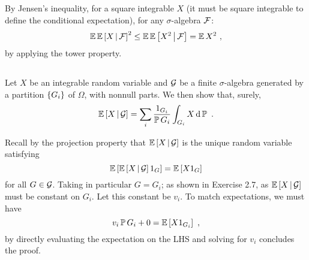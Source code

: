 \documentclass{article}
\begin{document}
        \subsection{}

        
        By Jensen's inequality, for a square integrable \(X\) (it must be square integrable to define the conditional expectation), for any \(\sigma\)-algebra \(\mathcal{F}\):
        \[
          \operatorname{\mathbb{E}}\operatorname{\mathbb{E}}\left[ X \,\middle|\, \mathcal{F} \right]^2\le \operatorname{\mathbb{E}}\operatorname{\mathbb{E}}\left[ X^2 \,\middle|\, \mathcal{F} \right]=\operatorname{\mathbb{E}} X^2\,\,,
        \]
        by applying the tower property.

        \subsection{}

        Let \(X\) be an integrable random variable and \(\mathcal{G}\) be a finite \(\sigma\)-algebra generated by a partition \(\left\{{G_i}\right\}\) of \(\Omega\), with nonnull parts. We then show that, surely,
        \[
          \operatorname{\mathbb{E}}\left[ X \,\middle|\, \mathcal{G} \right]=\sum_i\frac{1_{G_i}}{\operatorname{\mathbb{P}} G_i}\int_{G_i}X\mathop{\mathrm{d} \operatorname{\mathbb{P}} }\,\,.
        \]

        Recall by the projection property that \(\operatorname{\mathbb{E}}\left[ X \,\middle|\, \mathcal{G} \right]\) is the unique random variable satisfying
        \[
          \operatorname{\mathbb{E}}\left[{\operatorname{\mathbb{E}}\left[ X \,\middle|\, \mathcal{G} \right]1_G}\right]=\operatorname{\mathbb{E}}\left[{X1_G}\right]
        \]
        for all \(G\in \mathcal{G}\). Taking in particular \(G=G_i\); as shown in Exercise 2.7, as \(\operatorname{\mathbb{E}}\left[ X \,\middle|\, \mathcal{G} \right]\) must be constant on \(G_i\). Let this constant be \(v_i\). To match expectations, we must have
        \[
          v_i\operatorname{\mathbb{P}} G_i+0=\operatorname{\mathbb{E}}\left[{X1_{G_i}}\right]\,\,,
        \]
        by directly evaluating the expectation on the LHS and solving for \(v_i\) concludes the proof.
        
\end{document}
